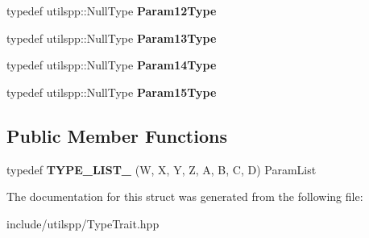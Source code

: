 \begin{DoxyCompactItemize}
\item 
\hypertarget{structutilspp_1_1PointerOnFunction_3_01V_07_5_08_07W_00_01X_00_01Y_00_01Z_00_01A_00_01B_00_01C_00_01D_08_4_abccff14a8b40e6824bc8bf0365754fce}{typedef utilspp\-::\-Null\-Type {\bfseries Param12\-Type}}\label{structutilspp_1_1PointerOnFunction_3_01V_07_5_08_07W_00_01X_00_01Y_00_01Z_00_01A_00_01B_00_01C_00_01D_08_4_abccff14a8b40e6824bc8bf0365754fce}

\item 
\hypertarget{structutilspp_1_1PointerOnFunction_3_01V_07_5_08_07W_00_01X_00_01Y_00_01Z_00_01A_00_01B_00_01C_00_01D_08_4_a905e5f41b5c9b72ffb705f6ed5458f99}{typedef utilspp\-::\-Null\-Type {\bfseries Param13\-Type}}\label{structutilspp_1_1PointerOnFunction_3_01V_07_5_08_07W_00_01X_00_01Y_00_01Z_00_01A_00_01B_00_01C_00_01D_08_4_a905e5f41b5c9b72ffb705f6ed5458f99}

\item 
\hypertarget{structutilspp_1_1PointerOnFunction_3_01V_07_5_08_07W_00_01X_00_01Y_00_01Z_00_01A_00_01B_00_01C_00_01D_08_4_acf8262cbc9804bb97c1bee8013cd1ed3}{typedef utilspp\-::\-Null\-Type {\bfseries Param14\-Type}}\label{structutilspp_1_1PointerOnFunction_3_01V_07_5_08_07W_00_01X_00_01Y_00_01Z_00_01A_00_01B_00_01C_00_01D_08_4_acf8262cbc9804bb97c1bee8013cd1ed3}

\item 
\hypertarget{structutilspp_1_1PointerOnFunction_3_01V_07_5_08_07W_00_01X_00_01Y_00_01Z_00_01A_00_01B_00_01C_00_01D_08_4_aa709e9cb9af7efd4ab8a7479dc64f4fb}{typedef utilspp\-::\-Null\-Type {\bfseries Param15\-Type}}\label{structutilspp_1_1PointerOnFunction_3_01V_07_5_08_07W_00_01X_00_01Y_00_01Z_00_01A_00_01B_00_01C_00_01D_08_4_aa709e9cb9af7efd4ab8a7479dc64f4fb}

\end{DoxyCompactItemize}
\subsection*{Public Member Functions}
\begin{DoxyCompactItemize}
\item 
\hypertarget{structutilspp_1_1PointerOnFunction_3_01V_07_5_08_07W_00_01X_00_01Y_00_01Z_00_01A_00_01B_00_01C_00_01D_08_4_a1edf3eec792eae67d5481e55aad9e7ad}{typedef {\bfseries T\-Y\-P\-E\-\_\-\-L\-I\-S\-T\-\_} (W, X, Y, Z, A, B, C, D) Param\-List}\label{structutilspp_1_1PointerOnFunction_3_01V_07_5_08_07W_00_01X_00_01Y_00_01Z_00_01A_00_01B_00_01C_00_01D_08_4_a1edf3eec792eae67d5481e55aad9e7ad}

\end{DoxyCompactItemize}


The documentation for this struct was generated from the following file\-:\begin{DoxyCompactItemize}
\item 
include/utilspp/Type\-Trait.\-hpp\end{DoxyCompactItemize}
